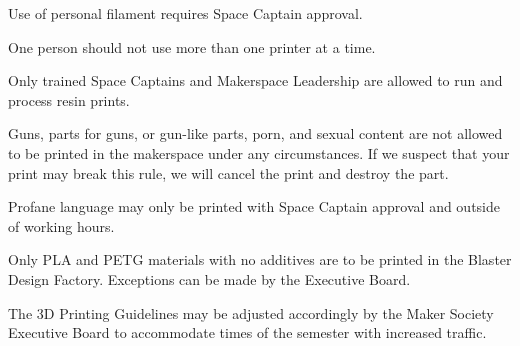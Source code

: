 \documentclass[12pt,letterpaper]{article}
\newcommand{\bremove}[1]{
    {\color{red}#1}
}
\begin{document}
\begin{enumerate}
    \bremove{\item Use of personal filament requires Space Captain approval.}
    \item One person should not use more than one printer at a time. 
    \bremove{\item Only trained Space Captains and Makerspace Leadership are allowed to run and process resin prints.}
    \item Guns, parts for guns, or gun-like parts, porn, and sexual content are not allowed to be printed in the makerspace under any circumstances. If we suspect that your print may break this rule, we will cancel the print and destroy the part.  
    \item Profane language may only be printed with Space Captain approval and outside of working hours. 
    \bremove{\item Only PLA and PETG materials with no additives are to be printed in the Blaster Design Factory. Exceptions can be made by the Executive Board.}
    \item The 3D Printing Guidelines may be adjusted accordingly by the Maker Society Executive Board to accommodate times of the semester with increased traffic. 
\end{enumerate}
\end{document}
